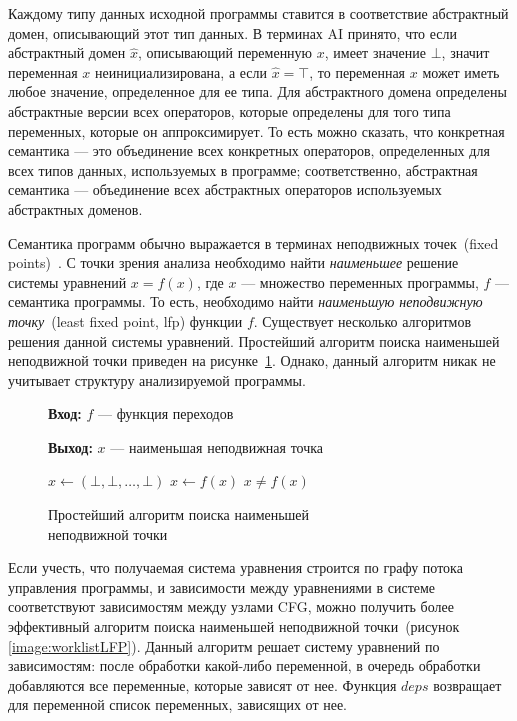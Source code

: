 Каждому типу данных исходной программы ставится в соответствие абстрактный
домен, описывающий этот тип данных. В терминах AI принято, что если абстрактный
домен $\hat{x}$, описывающий переменную $x$, имеет значение $\bot$, значит 
переменная $x$ неинициализирована, а если $\hat{x} = \top$, то переменная $x$
может иметь любое значение, определенное для ее типа. Для абстрактного домена
определены абстрактные версии всех операторов, которые определены для того
типа переменных, которые он аппроксимирует. То есть можно сказать, что 
конкретная семантика --- это объединение всех конкретных операторов, 
определенных для всех типов данных, используемых в программе; соответственно,
абстрактная семантика --- объединение всех абстрактных операторов используемых 
абстрактных доменов.

Семантика программ обычно выражается в терминах неподвижных точек~(fixed 
points)~\cite{fixedPoint}. С точки зрения анализа необходимо найти
\emph{наименьшее} решение системы уравнений $x = f(x)$, где $x$ --- множество
переменных программы, $f$ --- семантика программы. То есть, необходимо найти
\emph{наименьшую неподвижную точку}~(least fixed point, lfp) функции $f$.
Существует несколько алгоритмов решения данной системы уравнений. Простейший 
алгоритм поиска наименьшей неподвижной точки приведен на 
рисунке~\ref{image:nativeLFP}. Однако, данный алгоритм никак не учитывает 
структуру анализируемой программы.

\begin{figure}[h!]
\textbf{Вход:} $f$ --- функция переходов

\textbf{Выход:} $x$ --- наименьшая неподвижная точка

\begin{algorithmic} 
\State $x \gets (\bot, \bot, \ldots, \bot)$ 
\Repeat 
	\State $x \gets f(x)$ 
\Until $x \ne f(x)$ 
\end{algorithmic}

\caption{Простейший алгоритм поиска наименьшей\\неподвижной точки}
\label{image:nativeLFP}
\end{figure}

Если учесть, что получаемая система уравнения строится по графу потока 
управления программы, и зависимости между уравнениями в системе соответствуют
зависимостям между узлами CFG, можно получить более эффективный алгоритм поиска
наименьшей неподвижной точки~(рисунок \ref{image:worklistLFP}). Данный алгоритм решает
систему уравнений по зависимостям: после обработки какой-либо переменной,
в очередь обработки добавляются все переменные, которые зависят от нее. Функция
$deps$ возвращает для переменной список переменных, зависящих от нее.

